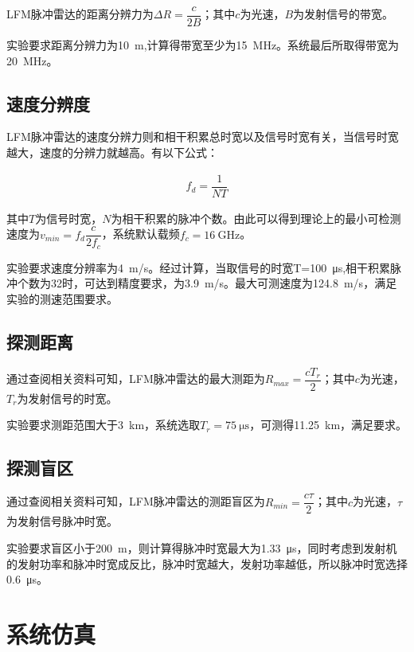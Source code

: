 \documentclass{article}
\newcounter{sub}
\begin{document}
LFM脉冲雷达的距离分辨力为$ \Delta R=\dfrac{c}{2B} $；其中$ c $为光速，$ B $为发射信号的带宽。

实验要求距离分辨力为\SI{10}{m},计算得带宽至少为\SI{15}{MHz}。系统最后所取得带宽为\SI{20}{MHz}。

\subsection{速度分辨度}%
\label{sub:速度分辨度}

LFM脉冲雷达的速度分辨力则和相干积累总时宽以及信号时宽有关，当信号时宽越大，速度的分辨力就越高。有以下公式：

\begin{align}
	f_d=\dfrac{1}{NT}
\end{align}

其中$ T $为信号时宽，$ N $为相干积累的脉冲个数。由此可以得到理论上的最小可检测速度为$ v_{min}=f_d\dfrac{c}{2f_c} $，系统默认载频$ f_c=\SI{16}{\GHz} $。

实验要求速度分辨率为\SI{4}{\m/\s}。经过计算，当取信号的时宽T=\SI{100}{\us},相干积累脉冲个数为32时，可达到精度要求，为\SI{3.9}{m/s}。最大可测速度为\SI{124.8}{\m/\s}，满足实验的测速范围要求。

\subsection{探测距离}%
\label{sub:探测距离}

通过查阅相关资料可知，LFM脉冲雷达的最大测距为$ R_{max}= \dfrac{cT_r}{2} $；其中$ c $为光速，$ T_r $为发射信号的时宽。

实验要求测距范围大于\SI{3}{\km}，系统选取$ T_r=\SI{75}{\us} $，可测得\SI{11.25}{\km}，满足要求。

\subsection{探测盲区}%
\label{sub:探测盲区}

通过查阅相关资料可知，LFM脉冲雷达的测距盲区为$ R_{min}= \dfrac{c\tau}{2} $；其中$ c $为光速，$ \tau $为发射信号脉冲时宽。

实验要求盲区小于\SI{200}{\m}，则计算得脉冲时宽最大为\SI{1.33}{\us}，同时考虑到发射机的发射功率和脉冲时宽成反比，脉冲时宽越大，发射功率越低，所以脉冲时宽选择\SI{0.6}{\us}。

\section{系统仿真}%
\label{sec:系统仿真}
\end{document}
